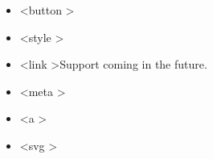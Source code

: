 \documentclass{article}
\begin{document}
\begin{itemize}
\begin{itemize}
        \begin{itemize}
            \item \textless button \textgreater
            \item \textless style \textgreater
            \item \textless link \textgreater Support coming in the future.
            \item \textless meta \textgreater
            \item \textless a \textgreater
            \item \textless svg \textgreater
        \end{itemize}
    \end{itemize}
\end{itemize}




\end{document}
